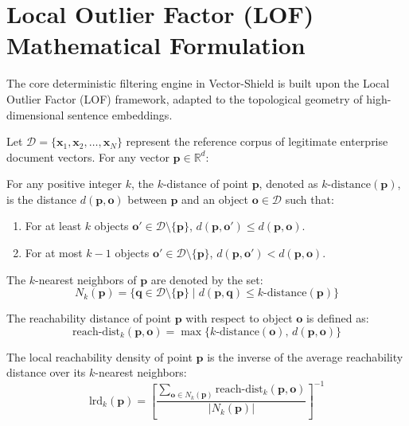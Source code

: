 \label{chap:stage1}
\section{Local Outlier Factor (LOF) Mathematical Formulation}
The core deterministic filtering engine in Vector-Shield is built upon the Local Outlier Factor (LOF) framework, adapted to the topological geometry of high-dimensional sentence embeddings.

Let $\mathcal{D} = \{\mathbf{x}_1, \mathbf{x}_2, \dots, \mathbf{x}_N\}$ represent the reference corpus of legitimate enterprise document vectors. For any vector $\mathbf{p} \in \mathbb{R}^d$:

\begin{Definition}
For any positive integer $k$, the $k$-distance of point $\mathbf{p}$, denoted as $k\text{-distance}(\mathbf{p})$, is the distance $d(\mathbf{p}, \mathbf{o})$ between $\mathbf{p}$ and an object $\mathbf{o} \in \mathcal{D}$ such that:
\begin{enumerate}
    \item For at least $k$ objects $\mathbf{o}' \in \mathcal{D} \setminus \{\mathbf{p}\}$, $d(\mathbf{p}, \mathbf{o}') \le d(\mathbf{p}, \mathbf{o})$.
    \item For at most $k-1$ objects $\mathbf{o}' \in \mathcal{D} \setminus \{\mathbf{p}\}$, $d(\mathbf{p}, \mathbf{o}') < d(\mathbf{p}, \mathbf{o})$.
\end{enumerate}
\end{Definition}

The $k$-nearest neighbors of $\mathbf{p}$ are denoted by the set:
\begin{equation}
    N_k(\mathbf{p}) = \{\mathbf{q} \in \mathcal{D} \setminus \{\mathbf{p}\} \mid d(\mathbf{p}, \mathbf{q}) \le k\text{-distance}(\mathbf{p})\}
\end{equation}

\begin{Definition}
The reachability distance of point $\mathbf{p}$ with respect to object $\mathbf{o}$ is defined as:
\begin{equation}
    \text{reach-dist}_k(\mathbf{p}, \mathbf{o}) = \max \{ k\text{-distance}(\mathbf{o}),\, d(\mathbf{p}, \mathbf{o}) \}
\end{equation}
\end{Definition}

\begin{Definition}
The local reachability density of point $\mathbf{p}$ is the inverse of the average reachability distance over its $k$-nearest neighbors:
\begin{equation}
    \text{lrd}_k(\mathbf{p}) = \left[ \frac{\sum_{\mathbf{o} \in N_k(\mathbf{p})} \text{reach-dist}_k(\mathbf{p}, \mathbf{o})}{|N_k(\mathbf{p})|} \right]^{-1}
\end{equation}
\end{Definition}

